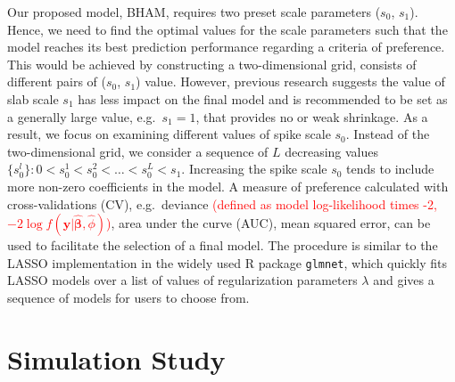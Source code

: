 \documentclass[AMA,STIX1COL,]{WileyNJD-v2}
\begin{document}
Our proposed model, BHAM, requires two preset scale parameters (\(s_0\),
\(s_1\)). Hence, we need to find the optimal values for the scale
parameters such that the model reaches its best prediction performance
regarding a criteria of preference. This would be achieved by
constructing a two-dimensional grid, consists of different pairs of
(\(s_0\), \(s_1\)) value. However, previous research suggests the value
of slab scale \(s_1\) has less impact on the final model and is
recommended to be set as a generally large value, e.g.~\(s_1 = 1\), that
provides no or weak shrinkage. \citep{Rockova2018} As a result, we focus
on examining different values of spike scale \(s_0\). Instead of the
two-dimensional grid, we consider a sequence of \(L\) decreasing values
\(\{s_0^l\}: 0 < s_0^1 < s_0^2 < \dots < s_0^L < s_1\). Increasing the
spike scale \(s_0\) tends to include more non-zero coefficients in the
model. A measure of preference calculated with cross-validations (CV),
e.g.~deviance
\textcolor{red}{(defined as model log-likelihood times -2, $-2\log f(\boldsymbol{y}|\boldsymbol{\hat\beta}, \hat\phi)$)},
area under the curve (AUC), mean squared error, can be used to
facilitate the selection of a final model. The procedure is similar to
the LASSO implementation in the widely used R package \texttt{glmnet},
which quickly fits LASSO models over a list of values of regularization
parameters \(\lambda\) and gives a sequence of models for users to
choose from.

\section{Simulation Study}
\label{sec:sim}
\end{document}
